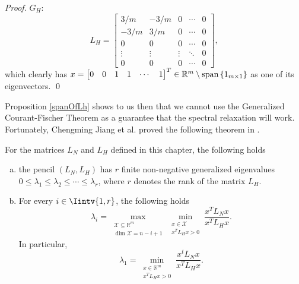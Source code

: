 \begin{proof}
   $G_H$:
   \begin{equation*}
      L_H =
      \begin{bmatrix}
         3/m & -3/m & 0 & \cdots & 0 \\
         -3/m & 3/m & 0 & \cdots & 0 \\
         0 & 0 & 0 & \cdots & 0 \\
         \vdots & \vdots & \vdots & \ddots & 0 \\
         0 & 0 & 0 & \cdots & 0 
      \end{bmatrix},
   \end{equation*}
   which clearly has $x = {\begin{bmatrix} 0 & 0 & 1 & 1 & \cdots & 1 \end{bmatrix}}^T \in \mathbb R ^{m} \setminus \operatorname{span\,} \{ 1_{m \times 1} \}$ as one of its eigenvectors. \qed
\end{proof}

Proposition \vref{spanOfLh} shows to us then that we cannot use the Generalized Courant-Fischer Theorem as a guarantee that the spectral relaxation will work.
Fortunately, Chengming Jiang et al. proved the following theorem in \cite{fastge2}.

\begin{theorem}
   \label{fastge2theorem}
   For the matrices $L_N$ and $L_H$ defined in this chapter, the following holds
   \begin{enumerate}[(a)]
      \item the pencil $(L_N, L_H)$ has $r$ finite non-negative generalized eigenvalues $0 \le \lambda_1 \le \lambda_2 \le \cdots \le \lambda_r$, where $r$ denotes the rank of the matrix $L_H$.
      \item For every $i \in \Iintv{1,r}$, the following holds
         \begin{equation}
            \lambda_i = \max_{\substack{\mathcal X \subseteq \mathbb R^m \\ \dim {\mathcal X} = n-i+1 }} \min_{\substack{x \in \mathcal X \\ x^T L_H x > 0}} \frac{x^T L_N x}{x^T L_H x}.
         \end{equation}
         In particular, 
         \begin{equation}
            \lambda_1 = \min_{\substack{x \in \mathbb R^m \\ x^TL_Hx>0}} \frac{x^tL_N x}{x^T L_H x}.
         \end{equation}
   \end{enumerate}
\end{theorem}

